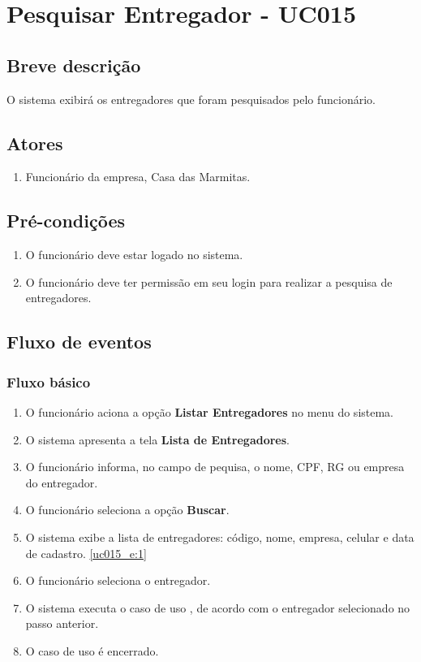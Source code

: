 \chapter{Pesquisar Entregador - UC015} \label{uc015}

\section{Breve descrição}

O sistema exibirá os entregadores que foram pesquisados pelo funcionário.

\section{Atores}

\begin{enumerate}
	\item Funcionário da empresa, Casa das Marmitas.
\end{enumerate}

\section{Pré-condições}

\begin{enumerate}
	\item O funcionário deve estar logado no sistema.
	\item O funcionário deve ter permissão em seu login para realizar a pesquisa de entregadores.
\end{enumerate}

\section{Fluxo de eventos}

\subsection{Fluxo básico}

\begin{enumerate}[label=P\arabic*]
	\item O funcionário aciona a opção \textbf{Listar Entregadores} no menu do sistema.
	\item O sistema apresenta a tela \textbf{Lista de Entregadores}. \label{uc015_p:2}	
	\item O funcionário informa, no campo de pequisa, o nome, CPF, RG ou empresa do entregador.
	\item O funcionário seleciona a opção \textbf{Buscar}.
	\item O sistema exibe a lista de entregadores: código, nome, empresa, celular e data de cadastro. \label{uc015_p:5}\ref{uc015_e:1}
	\item O funcionário seleciona o entregador.
	\item O sistema executa o caso de uso , de acordo com o entregador selecionado no passo anterior.
	\item O caso de uso é encerrado.
\end{enumerate}

